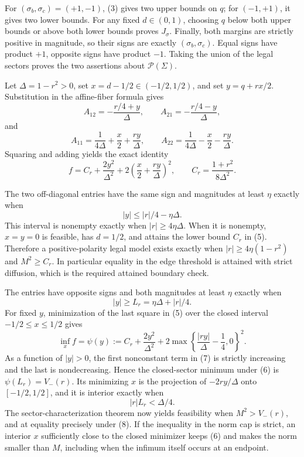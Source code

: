 For \((\sigma_b,\sigma_c)=(+1,-1)\), (3) gives two upper bounds on \(q\); for \((-1,+1)\), it gives two lower bounds.  For any fixed \(d\in(0,1)\), choosing \(q\) below both upper bounds or above both lower bounds proves \(J_{\sigma}\).  Finally, both margins are strictly positive in magnitude, so their signs are exactly \((\sigma_b,\sigma_c)\).  Equal signs have product \(+1\), opposite signs have product \(-1\).  Taking the union of the legal sectors proves the two assertions about \(\mathcal P(\Sigma)\).

Let \(\Delta=1-r^2>0\), set \(x=d-1/2\in(-1/2,1/2)\), and set \(y=q+rx/2\).  Substitution in the affine-fiber formula gives
\[
 A_{12}=-\frac{r/4+y}{\Delta},\qquad
 A_{21}=-\frac{r/4-y}{\Delta},
\]
and
\[
 A_{11}=\frac1{4\Delta}+\frac x2+\frac{ry}{\Delta},\qquad
 A_{22}=\frac1{4\Delta}-\frac x2-\frac{ry}{\Delta}.
\]
Squaring and adding yields the exact identity
\[
 f=C_r+\frac{2y^2}{\Delta^2}
 +2\left(\frac x2+\frac{ry}{\Delta}\right)^2,\qquad
 C_r=\frac{1+r^2}{8\Delta^2}. \tag{5}
\]

The two off-diagonal entries have the same sign and magnitudes at least \(\eta\) exactly when
\[
 |y|\le |r|/4-\eta\Delta.
\]
This interval is nonempty exactly when \(|r|\ge4\eta\Delta\).  When it is nonempty, \(x=y=0\) is feasible, has \(d=1/2\), and attains the lower bound \(C_r\) in (5).  Therefore a positive-polarity legal model exists exactly when \(|r|\ge4\eta(1-r^2)\) and \(M^2\ge C_r\).  In particular equality in the edge threshold is attained with strict diffusion, which is the required attained boundary check.

The entries have opposite signs and both magnitudes at least \(\eta\) exactly when
\[
 |y|\ge L_r=\eta\Delta+|r|/4. \tag{6}
\]
For fixed \(y\), minimization of the last square in (5) over the closed interval \(-1/2\le x\le1/2\) gives
\[
 \inf_x f
 =\psi(y):=C_r+\frac{2y^2}{\Delta^2}
 +2\max\left\{\frac{|ry|}{\Delta}-\frac14,0\right\}^2. \tag{7}
\]
As a function of \(|y|>0\), the first nonconstant term in (7) is strictly increasing and the last is nondecreasing.  Hence the closed-sector minimum under (6) is \(\psi(L_r)=V_-(r)\).  Its minimizing \(x\) is the projection of \(-2ry/\Delta\) onto \([-1/2,1/2]\), and it is interior exactly when
\[
 |r|L_r<\Delta/4. \tag{8}
\]
The sector-characterization theorem now yields feasibility when \(M^2>V_-(r)\), and at equality precisely under (8).  If the inequality in the norm cap is strict, an interior \(x\) sufficiently close to the closed minimizer keeps (6) and makes the norm smaller than \(M\), including when the infimum itself occurs at an endpoint.

